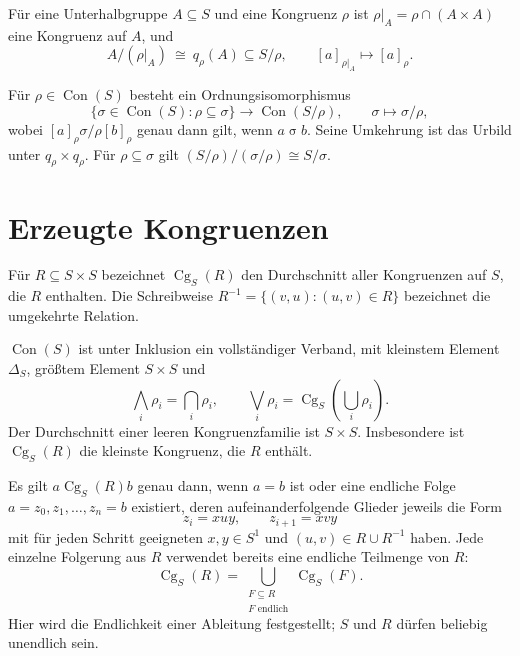\begin{theorem}
Für eine Unterhalbgruppe $A\subseteq S$ und eine Kongruenz $\rho$
ist $\rho|_A=\rho\cap(A\times A)$ eine Kongruenz auf $A$, und
\[
 A/(\rho|_A)\ \cong\ q_\rho(A)\subseteq S/\rho,
 \qquad [a]_{\rho|_A}\longmapsto[a]_\rho .
\]
\cite{howie}
\end{theorem}

\begin{theorem}
\label{b28guide:thm:correspondence}
Für $\rho\in\operatorname{Con}(S)$ besteht ein Ordnungsisomorphismus
\[
 \{\sigma\in\operatorname{Con}(S):\rho\subseteq\sigma\}
 \longrightarrow\operatorname{Con}(S/\rho),\qquad
 \sigma\longmapsto\sigma/\rho ,
\]
wobei $[a]_\rho\mathrel{\sigma/\rho}[b]_\rho$ genau dann gilt,
wenn $a\mathrel{\sigma}b$.
Seine Umkehrung ist das Urbild unter $q_\rho\times q_\rho$.
Für $\rho\subseteq\sigma$ gilt $(S/\rho)/(\sigma/\rho)\cong S/\sigma$.

\cite{harju,gould}
\end{theorem}

\section{Erzeugte Kongruenzen}

\begin{definition}
Für $R\subseteq S\times S$ bezeichnet
$\operatorname{Cg}_S(R)$ den Durchschnitt aller Kongruenzen auf $S$,
die $R$ enthalten.
Die Schreibweise $R^{-1}=\{(v,u):(u,v)\in R\}$ bezeichnet
die umgekehrte Relation.
\end{definition}

\begin{theorem}
$\operatorname{Con}(S)$ ist unter Inklusion ein vollständiger Verband,
mit kleinstem Element $\Delta_S$, größtem Element $S\times S$ und
\[
 \bigwedge_i\rho_i=\bigcap_i\rho_i,\qquad
 \bigvee_i\rho_i=\operatorname{Cg}_S\left(\bigcup_i\rho_i\right).
\]
Der Durchschnitt einer leeren Kongruenzfamilie ist $S\times S$.
Insbesondere ist $\operatorname{Cg}_S(R)$ die kleinste Kongruenz,
die $R$ enthält.
\cite{harju,howie}
\end{theorem}

\clearpage
\begin{theorem}
\label{b28guide:thm:chains}
Es gilt $a\mathrel{\operatorname{Cg}_S(R)}b$ genau dann, wenn
$a=b$ ist oder eine endliche Folge $a=z_0,z_1,\ldots,z_n=b$
existiert, deren aufeinanderfolgende Glieder jeweils die Form
\[
 z_i=xuy,\qquad z_{i+1}=xvy
\]
mit für jeden Schritt geeigneten $x,y\in S^1$ und
$(u,v)\in R\cup R^{-1}$ haben.
Jede einzelne Folgerung aus $R$ verwendet bereits eine endliche
Teilmenge von $R$:
\[
 \operatorname{Cg}_S(R)=
 \bigcup_{\substack{F\subseteq R\\F\text{ endlich}}}
 \operatorname{Cg}_S(F).
\]
Hier wird die Endlichkeit einer Ableitung festgestellt;
$S$ und $R$ dürfen beliebig unendlich sein.
\cite{harju}
\end{theorem}

